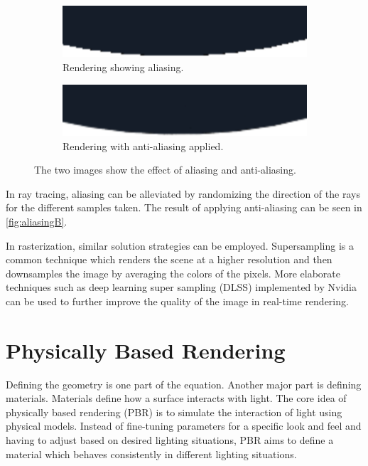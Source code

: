 \begin{figure}[H]
    \centering
    \begin{subfigure}[b]{0.45\textwidth}
        \includegraphics[width=\textwidth]{resources/aliasing.png}
        \caption{Rendering showing aliasing.}
        \label{fig:aliasingA}
    \end{subfigure}
    \hfill
    \begin{subfigure}[b]{0.45\textwidth}
        \includegraphics[width=\textwidth]{resources/anti-aliasing.png}
        \caption{Rendering with anti-aliasing applied.}
        \label{fig:aliasingB}
    \end{subfigure}
    \caption{The two images show the effect of aliasing and anti-aliasing.}
    \label{fig:aliasing}
\end{figure}

In ray tracing, aliasing can be alleviated by randomizing the direction of the rays for the different samples taken. The result of applying anti-aliasing can be seen in \autoref{fig:aliasingB}.

In rasterization, similar solution strategies can be employed. Supersampling is a common technique which renders the scene at a higher resolution and then downsamples the image by averaging the colors of the pixels. More elaborate techniques such as deep learning super sampling (DLSS) implemented by Nvidia \cite{nvidiaDlss} can be used to further improve the quality of the image in real-time rendering.

\section{Physically Based Rendering}

Defining the geometry is one part of the equation. Another major part is defining materials. Materials define how a surface interacts with light. The core idea of physically based rendering (PBR) is to simulate the interaction of light using physical models. Instead of fine-tuning parameters for a specific look and feel and having to adjust based on desired lighting situations, PBR aims to define a material which behaves consistently in different lighting situations.


